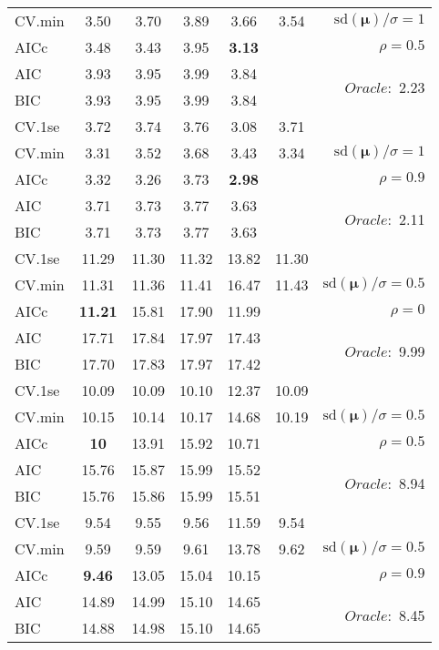 \begin{table}
\begin{center}
\begin{tabular}{l*{5}{c}|r}
CV.min & 3.50 & 3.70 & 3.89 & 3.66 & 3.54 &  $\mathrm{sd}(\mathbf{\mu})/\sigma=1$ \\
AICc & 3.48 & 3.43 & 3.95 & {\bf 3.13} & & $\rho=0.5$ \\
AIC & 3.93 & 3.95 & 3.99 & 3.84 & &  \multirow{2}{*}{$Oracle: $ 2.23} \\
BIC & 3.93 & 3.95 & 3.99 & 3.84 & &  \\
 \hline 
CV.1se & 3.72 & 3.74 & 3.76 & 3.08 & 3.71 & \\
CV.min & 3.31 & 3.52 & 3.68 & 3.43 & 3.34 &  $\mathrm{sd}(\mathbf{\mu})/\sigma=1$ \\
AICc & 3.32 & 3.26 & 3.73 & {\bf 2.98} & & $\rho=0.9$ \\
AIC & 3.71 & 3.73 & 3.77 & 3.63 & &  \multirow{2}{*}{$Oracle: $ 2.11} \\
BIC & 3.71 & 3.73 & 3.77 & 3.63 & &  \\
 \hline 
CV.1se & 11.29 & 11.30 & 11.32 & 13.82 & 11.30 & \\
CV.min & 11.31 & 11.36 & 11.41 & 16.47 & 11.43 &  $\mathrm{sd}(\mathbf{\mu})/\sigma=0.5$ \\
AICc & {\bf 11.21} & 15.81 & 17.90 & 11.99 & & $\rho=0$ \\
AIC & 17.71 & 17.84 & 17.97 & 17.43 & &  \multirow{2}{*}{$Oracle: $ 9.99} \\
BIC & 17.70 & 17.83 & 17.97 & 17.42 & &  \\
 \hline 
CV.1se & 10.09 & 10.09 & 10.10 & 12.37 & 10.09 & \\
CV.min & 10.15 & 10.14 & 10.17 & 14.68 & 10.19 &  $\mathrm{sd}(\mathbf{\mu})/\sigma=0.5$ \\
AICc & {\bf 10} & 13.91 & 15.92 & 10.71 & & $\rho=0.5$ \\
AIC & 15.76 & 15.87 & 15.99 & 15.52 & &  \multirow{2}{*}{$Oracle: $ 8.94} \\
BIC & 15.76 & 15.86 & 15.99 & 15.51 & &  \\
 \hline 
CV.1se & 9.54 & 9.55 & 9.56 & 11.59 & 9.54 & \\
CV.min & 9.59 & 9.59 & 9.61 & 13.78 & 9.62 &  $\mathrm{sd}(\mathbf{\mu})/\sigma=0.5$ \\
AICc & {\bf 9.46} & 13.05 & 15.04 & 10.15 & & $\rho=0.9$ \\
AIC & 14.89 & 14.99 & 15.10 & 14.65 & &  \multirow{2}{*}{$Oracle: $ 8.45} \\
BIC & 14.88 & 14.98 & 15.10 & 14.65 & &  \\
 \hline 
\end{tabular}
\end{center}
\vspace{-1cm}
\end{table}




